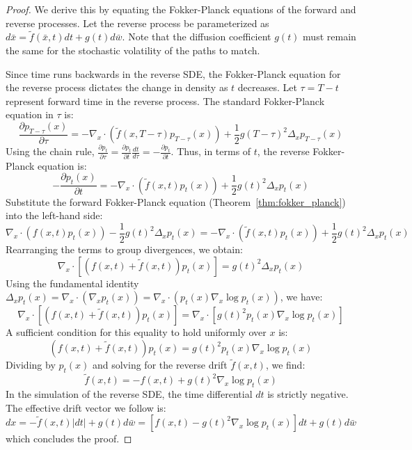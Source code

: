 \begin{proof}
We derive this by equating the Fokker-Planck equations of the forward and reverse processes. Let the reverse process be parameterized as $d\bar{x} = \tilde{f}(\bar{x}, t) dt + g(t) d\bar{w}$. Note that the diffusion coefficient $g(t)$ must remain the same for the stochastic volatility of the paths to match. 

Since time runs backwards in the reverse SDE, the Fokker-Planck equation for the reverse process dictates the change in density as $t$ decreases. Let $\tau = T - t$ represent forward time in the reverse process. The standard Fokker-Planck equation in $\tau$ is:
\begin{equation}
\frac{\partial p_{T-\tau}(x)}{\partial \tau} = -\nabla_x \cdot (\tilde{f}(x, T-\tau) p_{T-\tau}(x)) + \frac{1}{2} g(T-\tau)^2 \Delta_x p_{T-\tau}(x)
\end{equation}
Using the chain rule, $\frac{\partial p_t}{\partial \tau} = \frac{\partial p_t}{\partial t} \frac{dt}{d\tau} = -\frac{\partial p_t}{\partial t}$. Thus, in terms of $t$, the reverse Fokker-Planck equation is:
\begin{equation}
-\frac{\partial p_t(x)}{\partial t} = -\nabla_x \cdot (\tilde{f}(x, t) p_t(x)) + \frac{1}{2} g(t)^2 \Delta_x p_t(x)
\end{equation}
Substitute the forward Fokker-Planck equation (Theorem~\ref{thm:fokker_planck}) into the left-hand side:
\begin{equation}
\nabla_x \cdot (f(x, t) p_t(x)) - \frac{1}{2} g(t)^2 \Delta_x p_t(x) = -\nabla_x \cdot (\tilde{f}(x, t) p_t(x)) + \frac{1}{2} g(t)^2 \Delta_x p_t(x)
\end{equation}
Rearranging the terms to group divergences, we obtain:
\begin{equation}
\nabla_x \cdot \left[ (f(x, t) + \tilde{f}(x, t)) p_t(x) \right] = g(t)^2 \Delta_x p_t(x)
\end{equation}
Using the fundamental identity $\Delta_x p_t(x) = \nabla_x \cdot (\nabla_x p_t(x)) = \nabla_x \cdot (p_t(x) \nabla_x \log p_t(x))$, we have:
\begin{equation}
\nabla_x \cdot \left[ (f(x, t) + \tilde{f}(x, t)) p_t(x) \right] = \nabla_x \cdot \left[ g(t)^2 p_t(x) \nabla_x \log p_t(x) \right]
\end{equation}
A sufficient condition for this equality to hold uniformly over $x$ is:
\begin{equation}
(f(x, t) + \tilde{f}(x, t)) p_t(x) = g(t)^2 p_t(x) \nabla_x \log p_t(x)
\end{equation}
Dividing by $p_t(x)$ and solving for the reverse drift $\tilde{f}(x, t)$, we find:
\begin{equation}
\tilde{f}(x, t) = -f(x, t) + g(t)^2 \nabla_x \log p_t(x)
\end{equation}
In the simulation of the reverse SDE, the time differential $dt$ is strictly negative. The effective drift vector we follow is:
\begin{equation}
dx = -\tilde{f}(x, t) |dt| + g(t) d\bar{w} = \left[ f(x, t) - g(t)^2 \nabla_x \log p_t(x) \right] dt + g(t) d\bar{w}
\end{equation}
which concludes the proof.
\end{proof}

